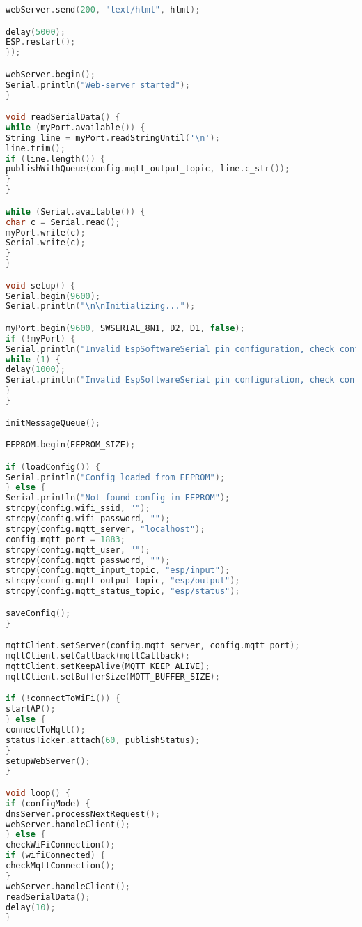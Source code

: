\begin{lstlisting}[language=C++]
webServer.send(200, "text/html", html);

delay(5000);
ESP.restart();
});

webServer.begin();
Serial.println("Web-server started");
}

void readSerialData() {
while (myPort.available()) {
String line = myPort.readStringUntil('\n');
line.trim();
if (line.length()) {
publishWithQueue(config.mqtt_output_topic, line.c_str());
}
}

while (Serial.available()) {
char c = Serial.read();
myPort.write(c);
Serial.write(c); 
}
}

void setup() {
Serial.begin(9600);
Serial.println("\n\nInitializing...");

myPort.begin(9600, SWSERIAL_8N1, D2, D1, false);
if (!myPort) {
Serial.println("Invalid EspSoftwareSerial pin configuration, check config"); 
while (1) {
delay(1000);
Serial.println("Invalid EspSoftwareSerial pin configuration, check config"); 
}
}

initMessageQueue();

EEPROM.begin(EEPROM_SIZE);

if (loadConfig()) {
Serial.println("Config loaded from EEPROM");
} else {
Serial.println("Not found config in EEPROM");
strcpy(config.wifi_ssid, "");
strcpy(config.wifi_password, "");
strcpy(config.mqtt_server, "localhost");
config.mqtt_port = 1883;
strcpy(config.mqtt_user, "");
strcpy(config.mqtt_password, "");
strcpy(config.mqtt_input_topic, "esp/input");
strcpy(config.mqtt_output_topic, "esp/output");
strcpy(config.mqtt_status_topic, "esp/status");

saveConfig();
}

mqttClient.setServer(config.mqtt_server, config.mqtt_port);
mqttClient.setCallback(mqttCallback);
mqttClient.setKeepAlive(MQTT_KEEP_ALIVE);
mqttClient.setBufferSize(MQTT_BUFFER_SIZE);

if (!connectToWiFi()) {
startAP();
} else {
connectToMqtt();
statusTicker.attach(60, publishStatus);
}
setupWebServer();
}

void loop() {
if (configMode) {
dnsServer.processNextRequest();
webServer.handleClient();
} else {
checkWiFiConnection();
if (wifiConnected) {
checkMqttConnection();
}
webServer.handleClient();
readSerialData();
delay(10);
}
\end{lstlisting}

\endinput
